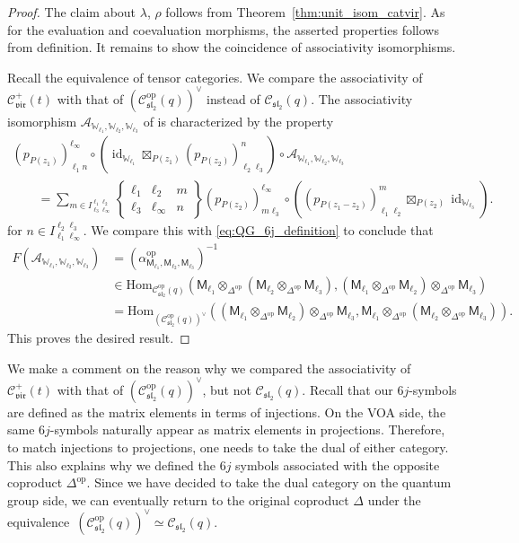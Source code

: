 \documentclass[10pt,a4paper]{amsart}
\numberwithin{equation}{section}
\newcommand{\Hom}{\mathrm{Hom}}
\newcommand{\id}{\operatorname{id}}
\newcommand{\op}{\mathrm{op}}
\newcommand{\cA}{\mathcal{A}}
\newcommand{\cC}{\mathcal{C}}
\newcommand{\fsl}{\mathfrak{sl}}
\newcommand{\sfM}{\mathsf{M}}
\newcommand{\QGirrep}[1]{\sfM_{#1}}
\newcommand{\QGcoprod}{\Delta}
\newcommand{\sixjsymb}[6]{
\left\{
\begin{array}{ccc}
 #1 & #2 & #5 \\
 #3 & #4 & #6
\end{array}
\right\}
}
\newcommand{\catQG}{\cC_{\fsl_{2}}}
\newcommand{\catVir}{\cC_{\vir}}
\newcommand{\Chan}[4]{I^{#1 #2}_{#3 #4}}
\newcommand{\virmod}{\mathbb{W}}
\newcommand{\vir}{\mathfrak{vir}}
\newcommand{\pzproj}[4]{(p_{P(#1)})_{#2 #3}^{#4}}
\begin{document}
\begin{proof}
The claim about $\lambda$, $\rho$ follows from Theorem~\ref{thm:unit_isom_catvir}.
As for the evaluation and coevaluation morphisms, the asserted properties follows from definition.
It remains to show the coincidence of associativity isomorphisms.

Recall the equivalence \smash{$\catQG (q) \simeq (\catQG^{\op}(q))^{\vee}$} of tensor categories.
We compare the associativity of $\catVir^{+}(t)$ with that of $(\catQG^{\op}(q))^{\vee}$ instead of $\catQG(q)$.
The associativity isomorphism $\cA_{\virmod_{\ell_{1}},\virmod_{\ell_{2}},\virmod_{\ell_{3}}}$ of \smash{$\catVir^{+}$} is characterized by the property
\begin{gather*}
 \pzproj{z_{1}}{\ell_{1}}{n}{\ell_{\infty}}\circ (\id_{\virmod_{\ell_{1}}}\boxtimes_{P(z_{1})}\pzproj{z_{2}}{\ell_{2}}{\ell_{3}}{n})\circ \cA_{\virmod_{\ell_{1}},\virmod_{\ell_{2}},\virmod_{\ell_{3}}} \\
 \qquad = \sum_{m\in \Chan{\ell_{1}}{\ell_{2}}{\ell_{3}}{\ell_{\infty}}}\sixjsymb{\ell_{1}}{\ell_{2}}{\ell_{3}}{\ell_{\infty}}{m}{n}\pzproj{z_{2}}{m}{\ell_{3}}{\ell_{\infty}}\circ (\pzproj{z_{1}-z_{2}}{\ell_{1}}{\ell_{2}}{m}\boxtimes_{P(z_{2})}\id_{\virmod_{\ell_{3}}}).
\end{gather*}
for $n\in \Chan{\ell_{2}}{\ell_{3}}{\ell_{1}}{\ell_{\infty}}$.
We compare this with \eqref{eq:QG_6j_definition} to conclude that
\begin{align*}
 F(\cA_{\virmod_{\ell_{1}},\virmod_{\ell_{2}},\virmod_{\ell_{3}}})&= (\alpha_{\QGirrep{\ell_{1}},\QGirrep{\ell_{2}},\QGirrep{\ell_{3}}}^{\op})^{-1}\\
 &\in \Hom_{\catQG^{\op}(q)}(\QGirrep{\ell_{1}}\otimes_{\QGcoprod^{\op}} (\QGirrep{\ell_{2}}\otimes_{\QGcoprod^{\op}}\QGirrep{\ell_{3}}),(\QGirrep{\ell_{1}}\otimes_{\QGcoprod^{\op}}\QGirrep{\ell_{2}})\otimes_{\QGcoprod^{\op}}\QGirrep{\ell_{3}}) \\
 &= \Hom_{(\catQG^{\op}(q))^{\vee}}((\QGirrep{\ell_{1}}\otimes_{\QGcoprod^{\op}}\QGirrep{\ell_{2}})\otimes_{\QGcoprod^{\op}}\QGirrep{\ell_{3}},\QGirrep{\ell_{1}}\otimes_{\QGcoprod^{\op}} (\QGirrep{\ell_{2}}\otimes_{\QGcoprod^{\op}}\QGirrep{\ell_{3}})).
\end{align*}
This proves the desired result.
\end{proof}

\begin{rem}
We make a comment on the reason why we compared the associativity of $\catVir^{+}(t)$ with that of $(\catQG^{\op}(q))^{\vee}$, but not $\catQG(q)$.
Recall that our $6j$-symbols are defined as the matrix elements in terms of injections.
On the VOA side, the same $6j$-symbols naturally appear as matrix elements in projections.
Therefore, to match injections to projections, one needs to take the dual of either category.
This also explains why we defined the $6j$ symbols associated with the opposite coproduct $\QGcoprod^{\op}$.
Since we have decided to take the dual category on the quantum group side, we can eventually return to the original coproduct $\QGcoprod$ under the equivalence~${(\catQG^{\op}(q))^{\vee}\simeq \catQG(q)}$.
\end{rem}
\end{document}
